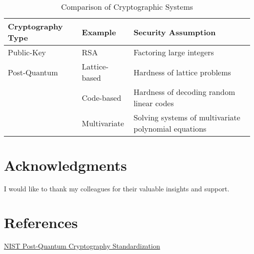 \documentclass[12pt]{article}
\begin{document}
\begin{table}[h]
\centering
\begin{tabular}{@{}lll@{}}
\toprule
\textbf{Cryptography Type} & \textbf{Example} & \textbf{Security Assumption} \\ \midrule
Public-Key & RSA & Factoring large integers \\
Post-Quantum & Lattice-based & Hardness of lattice problems \\
 & Code-based & Hardness of decoding random linear codes \\
 & Multivariate & Solving systems of multivariate polynomial equations \\ \bottomrule
\end{tabular}
\caption{Comparison of Cryptographic Systems}
\end{table}

\section*{Acknowledgments}
I would like to thank my colleagues for their valuable insights and support.

\section*{References}
\href{https://www.nist.gov/programs-projects/post-quantum-cryptography-standardization}{NIST Post-Quantum Cryptography Standardization}
\end{document}
